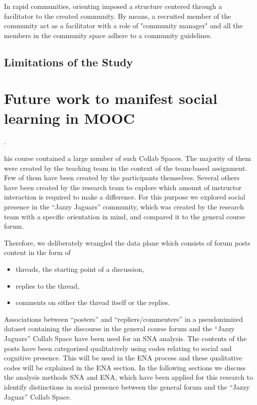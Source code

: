 \documentclass[manuscript,screen,review]{acmart}
\begin{document}
In rapid communities, orienting imposed a structure centered through a facilitator to the created community. By means, a recruited member of the community act as a facilitator with a role of "community manager" and all the members in the community space adhere to a community guidelines. 

\subsection{Limitations of the Study}

\section{Future work to manifest social learning in MOOC}




.  





his course contained a large number of such Collab Spaces. The majority of them were created by the teaching team in the context of the team-based assignment. Few of them have been created by the participants themselves.
Several others have been created by the research team to explore which amount of instructor interaction is required to make a difference. For this purpose we explored social presence in the ``Jazzy Jaguars'' community, which was created by the research team with a specific orientation in mind, and compared it to the general course forum. 

Therefore, we deliberately wrangled the data plane which consists of forum posts content in the form of
\begin{itemize}
    \item threads, the starting point of a discussion,
    \item replies to the thread,
    \item comments on either the thread itself or the replies.
\end{itemize}
Associations between ``posters'' and ``repliers/commenters'' in a pseudonimized dataset containing the discourse in the general course forum and the ``Jazzy Jaguars'' Collab Space have been used for an SNA analysis. 
The contents of the posts have been categorized qualitatively using codes relating to social and cognitive presence. 
This will be used in the ENA process and these qualitative codes will be explained in the ENA section. 
In the following sections we discuss the analysis methods SNA and ENA, which have been applied for this research to identify distinctions in social presence between the general forum and the ``Jazzy Jaguar'' Collab Space. 
\end{document}
